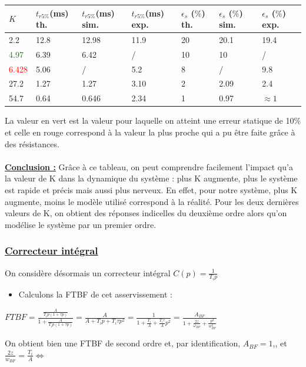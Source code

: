 \documentclass[12pt]{article}
\begin{document}
\begin{center}
    \begin{tabular}{ |p{1cm}|p{2.5cm}|p{2.5cm}|p{2.5cm}|p{2.5cm}|p{2.5cm}|p{2.5 cm}|}

        \hline
        $K$ & \normalsize  $t_{r5\%}$(ms) th. & $t_{r5\%}$(ms) sim. & $t_{r5\%}$(ms) exp.& $\epsilon_s$ ($\%$) th. & $\epsilon_s$ ($\%$) sim. & $\epsilon_s$ ($\%$) exp.\\
        \hline
        2.2& 12.8 & 12.98 & 11.9 &20 & 20.1 & 19.4\\
        \textcolor{green}{4.97} & 6.39 & 6.42 & / & 10 & 10 & / \\
        \textcolor{red}{6.428} & 5.06 & / &5.2 & 8 & / &9.8 \\
        27.2 & 1.27 & 1.27 & 3.10 &2 & 2.09 & 2.4\\
        54.7 & 0.64 & 0.646 & 2.34 &1 & 0.97 & $\approx 1$\\
        \hline
        \end{tabular}
    \end{center}
La valeur en vert est la valeur pour laquelle on atteint une erreur statique de 10$\%$ et celle en rouge correspond à la valeur la plus proche qui a pu être faite grâce à des résistances.
\\\\\underline{\bf Conclusion :} Grâce à ce tableau, on peut comprendre facilement l'impact qu'a la valeur de K dans la dynamique du système : plus K augmente, plus le système est rapide et précis mais aussi plus nerveux. En effet, pour notre système, plus K augmente, moins le modèle utilisé correspond à la réalité. Pour les deux dernières valeurs de K, on obtient des réponses indicelles du deuxième ordre alors qu'on modélise le système par un premier ordre.
\subsubsection{\underline{\bf Correcteur intégral}}

On considère désormais un correcteur intégral $C(p) = \frac{1}{T_ip}$

\begin{itemize}
    \item Calculons la FTBF de cet asservissement : 
\end{itemize}
\begin{center}
    \large $FTBF = \frac{\frac{A}{T_ip(1+\tau p)}}{1 + \frac{A}{T_ip(1+\tau p)}} = \frac{A}{A + T_ip + T_i\tau p^2} = \frac{1}{1 + \frac{T_i}{A} + \frac{T_i \tau}{A}p^2} = \frac{A_{BF}}{1 + \frac{2z}{\omega_{BF}} + \frac{p^2}{w_{BF}^2}}$

\end{center}
\normalsize On obtient bien une FTBF de second ordre et, par identification, $A_{BF} = 1$,, et $\frac{2z}{w_{BF}} = \frac{T_i}{A} \Leftrightarrow $
\end{document}
